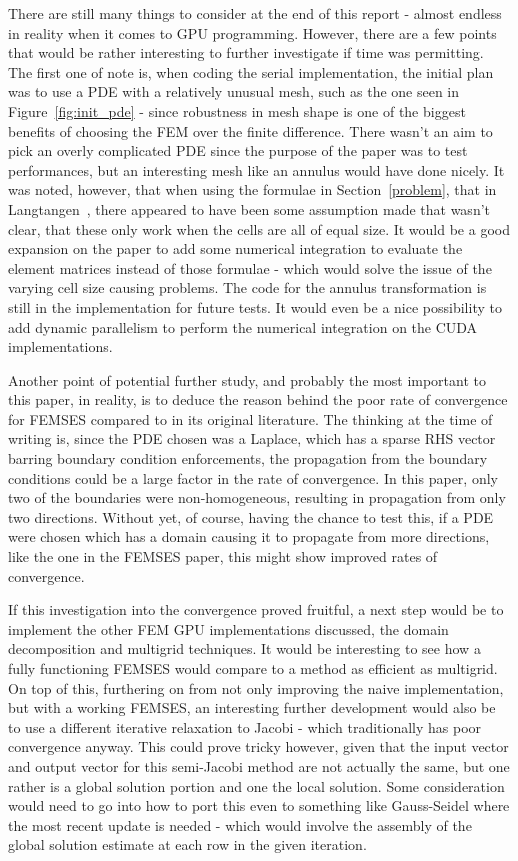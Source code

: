 There are still many things to consider at the end of this report - almost endless in reality when it comes to GPU programming. However, there are a few points that would be rather interesting to further investigate if time was permitting. The first one of note is, when coding the serial implementation, the initial plan was to use a PDE with a relatively unusual mesh, such as the one seen in Figure~\ref{fig:init_pde} - since robustness in mesh shape is one of the biggest benefits of choosing the FEM over the finite difference. There wasn't an aim to pick an overly complicated PDE since the purpose of the paper was to test performances, but an interesting mesh like an annulus would have done nicely. It was noted, however, that when using the formulae in Section~\ref{problem}, that in Langtangen~\cite{mardal}, there appeared to have been some assumption made that wasn't clear, that these only work when the cells are all of equal size. It would be a good expansion on the paper to add some numerical integration to evaluate the element matrices instead of those formulae - which would solve the issue of the varying cell size causing problems. The code for the annulus transformation is still in the implementation for future tests. It would even be a nice possibility to add dynamic parallelism to perform the numerical integration on the CUDA implementations.

Another point of potential further study, and probably the most important to this paper, in reality, is to deduce the reason behind the poor rate of convergence for FEMSES compared to in its original literature. The thinking at the time of writing is, since the PDE chosen was a Laplace, which has a sparse RHS vector barring boundary condition enforcements, the propagation from the boundary conditions could be a large factor in the rate of convergence. In this paper, only two of the boundaries were non-homogeneous, resulting in propagation from only two directions. Without yet, of course, having the chance to test this, if a PDE were chosen which has a domain causing it to propagate from more directions, like the one in the FEMSES paper, this might show improved rates of convergence.

If this investigation into the convergence proved fruitful, a next step would be to implement the other FEM GPU implementations discussed, the domain decomposition and multigrid techniques. It would be interesting to see how a fully functioning FEMSES would compare to a method as efficient as multigrid. On top of this, furthering on from not only improving the naive implementation, but with a working FEMSES, an interesting further development would also be to use a different iterative relaxation to Jacobi - which traditionally has poor convergence anyway. This could prove tricky however, given that the input vector and output vector for this semi-Jacobi method are not actually the same, but one rather is a global solution portion and one the local solution. Some consideration would need to go into how to port this even to something like Gauss-Seidel where the most recent update is needed - which would involve the assembly of the global solution estimate at each row in the given iteration.

